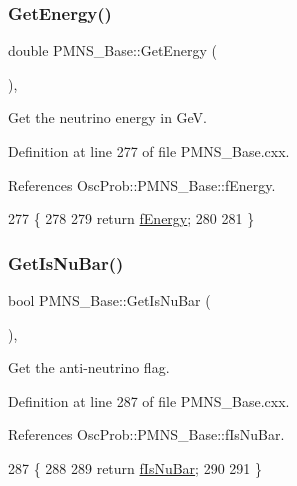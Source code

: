 \subsubsection{\texorpdfstring{Get\+Energy()}{GetEnergy()}}
{\footnotesize\ttfamily double P\+M\+N\+S\+\_\+\+Base\+::\+Get\+Energy (\begin{DoxyParamCaption}{ }\end{DoxyParamCaption})\hspace{0.3cm}{\ttfamily [virtual]}, {\ttfamily [inherited]}}

Get the neutrino energy in GeV. 

Definition at line 277 of file P\+M\+N\+S\+\_\+\+Base.\+cxx.



References Osc\+Prob\+::\+P\+M\+N\+S\+\_\+\+Base\+::f\+Energy.


\begin{DoxyCode}
277                             \{
278 
279   \textcolor{keywordflow}{return} \hyperlink{classOscProb_1_1PMNS__Base_a2800af6d436972f3e900867790c046b0}{fEnergy};
280 
281 \}
\end{DoxyCode}
\mbox{\label{classOscProb_1_1PMNS__Base_a2f7f2a028dfe7a90fff6b4f757972c2c}} 
\subsubsection{\texorpdfstring{Get\+Is\+Nu\+Bar()}{GetIsNuBar()}}
{\footnotesize\ttfamily bool P\+M\+N\+S\+\_\+\+Base\+::\+Get\+Is\+Nu\+Bar (\begin{DoxyParamCaption}{ }\end{DoxyParamCaption})\hspace{0.3cm}{\ttfamily [virtual]}, {\ttfamily [inherited]}}

Get the anti-\/neutrino flag. 

Definition at line 287 of file P\+M\+N\+S\+\_\+\+Base.\+cxx.



References Osc\+Prob\+::\+P\+M\+N\+S\+\_\+\+Base\+::f\+Is\+Nu\+Bar.


\begin{DoxyCode}
287                            \{
288 
289   \textcolor{keywordflow}{return} \hyperlink{classOscProb_1_1PMNS__Base_a0ebaeaefab36a3ff381c6293faedfdd6}{fIsNuBar};
290 
291 \}
\end{DoxyCode}
\mbox{\label{classOscProb_1_1PMNS__Base_ac8e196f2e85a2b1caaf705073ee95a5c}} 
